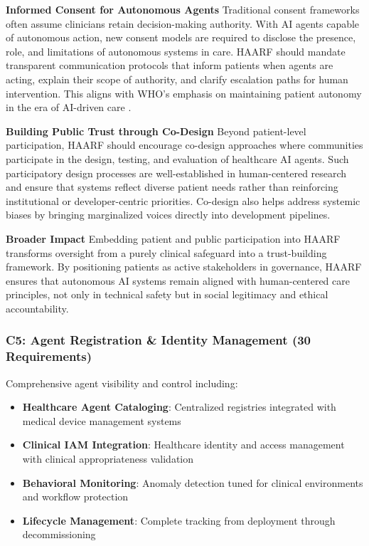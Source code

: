 \documentclass[11pt]{article}
\begin{document}
\textbf{Informed Consent for Autonomous Agents}  
Traditional consent frameworks often assume clinicians retain decision-making authority. With AI agents capable of autonomous action, new consent models are required to disclose the presence, role, and limitations of autonomous systems in care. HAARF should mandate transparent communication protocols that inform patients when agents are acting, explain their scope of authority, and clarify escalation paths for human intervention. This aligns with WHO’s emphasis on maintaining patient autonomy in the era of AI-driven care \cite{who2021aiethics}.

\textbf{Building Public Trust through Co-Design}  
Beyond patient-level participation, HAARF should encourage co-design approaches where communities participate in the design, testing, and evaluation of healthcare AI agents. Such participatory design processes are well-established in human-centered research and ensure that systems reflect diverse patient needs rather than reinforcing institutional or developer-centric priorities. Co-design also helps address systemic biases by bringing marginalized voices directly into development pipelines.

\textbf{Broader Impact}  
Embedding patient and public participation into HAARF transforms oversight from a purely clinical safeguard into a trust-building framework. By positioning patients as active stakeholders in governance, HAARF ensures that autonomous AI systems remain aligned with human-centered care principles, not only in technical safety but in social legitimacy and ethical accountability.


\subsubsection{C5: Agent Registration \& Identity Management (30 Requirements)}

Comprehensive agent visibility and control including:

\begin{itemize}
    \item \textbf{Healthcare Agent Cataloging}: Centralized registries integrated with medical device management systems
    \item \textbf{Clinical IAM Integration}: Healthcare identity and access management with clinical appropriateness validation
    \item \textbf{Behavioral Monitoring}: Anomaly detection tuned for clinical environments and workflow protection
    \item \textbf{Lifecycle Management}: Complete tracking from deployment through decommissioning
\end{itemize}
\end{document}
